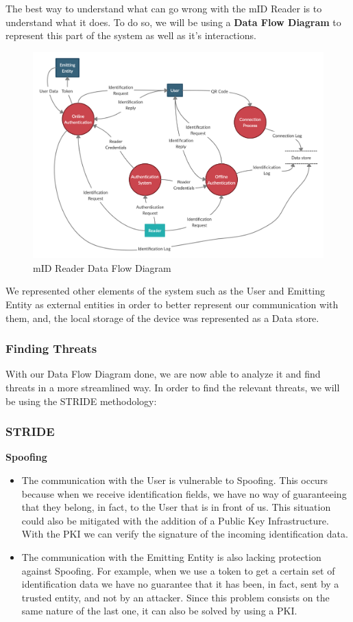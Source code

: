 The best way to understand what can go wrong with the mID Reader is to understand what it does. To do so, we will be using a \textbf{Data Flow Diagram} to represent this part of the system as well as it's interactions.

\begin{figure}[ht!]
 	\centering
 	\includegraphics[width=0.8\linewidth]{img/mIDReaderDFD.png}
 	\caption{mID Reader Data Flow Diagram}
 \end{figure}
 
 We represented other elements of the system such as the User and Emitting Entity as external entities in order to better represent our communication with them, and, the local storage of the device was represented as a Data store.

\subsubsection{Finding Threats}

With our Data Flow Diagram done, we are now able to analyze it and find threats in a more streamlined way. In order to find the relevant threats, we will be using the STRIDE methodology:

\subsubsection{STRIDE}

\textbf{Spoofing}
\begin{itemize}
    \item The communication with the User is vulnerable to Spoofing. This occurs because when we receive identification fields, we have no way of guaranteeing that they belong, in fact, to the User that is in front of us. This situation could also be mitigated with the addition of a Public Key Infrastructure\cite{pki}. With the PKI we can verify the signature of the incoming identification data.
    \item The communication with the Emitting Entity is also lacking protection against Spoofing. For example, when we use a token to get a certain set of identification data we have no guarantee that it has been, in fact, sent by a trusted entity, and not by an attacker. Since this problem consists on the same nature of the last one, it can also be solved by using a PKI\cite{pki}.
\end{itemize}

